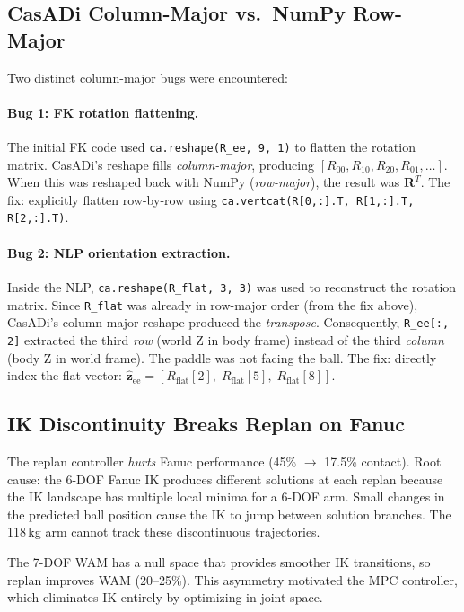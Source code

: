 \documentclass[11pt,letterpaper]{article}
\newcommand{\vv}[1]{\mathbf{#1}}
\begin{document}
\subsection{CasADi Column-Major vs.\ NumPy Row-Major}

Two distinct column-major bugs were encountered:

\paragraph{Bug 1: FK rotation flattening.}  The initial FK code used \texttt{ca.reshape(R\_ee, 9, 1)} to flatten the rotation matrix.  CasADi's reshape fills \emph{column-major}, producing $[R_{00}, R_{10}, R_{20}, R_{01}, \ldots]$.  When this was reshaped back with NumPy (\emph{row-major}), the result was $\vv{R}^T$.  The fix: explicitly flatten row-by-row using \texttt{ca.vertcat(R[0,:].T, R[1,:].T, R[2,:].T)}.

\paragraph{Bug 2: NLP orientation extraction.}  Inside the NLP, \texttt{ca.reshape(R\_flat, 3, 3)} was used to reconstruct the rotation matrix.  Since \texttt{R\_flat} was already in row-major order (from the fix above), CasADi's column-major reshape produced the \emph{transpose}.  Consequently, \texttt{R\_ee[:, 2]} extracted the third \emph{row} (world Z in body frame) instead of the third \emph{column} (body Z in world frame).  The paddle was not facing the ball.  The fix: directly index the flat vector: $\hat{\vv{z}}_{\text{ee}} = [R_{\text{flat}}[2],\; R_{\text{flat}}[5],\; R_{\text{flat}}[8]]$.

\subsection{IK Discontinuity Breaks Replan on Fanuc}

The replan controller \emph{hurts} Fanuc performance (45\% $\to$ 17.5\% contact).  Root cause: the 6-DOF Fanuc IK produces different solutions at each replan because the IK landscape has multiple local minima for a 6-DOF arm.  Small changes in the predicted ball position cause the IK to jump between solution branches.  The 118\,kg arm cannot track these discontinuous trajectories.

The 7-DOF WAM has a null space that provides smoother IK transitions, so replan improves WAM (20--25\%).  This asymmetry motivated the MPC controller, which eliminates IK entirely by optimizing in joint space.
\end{document}
